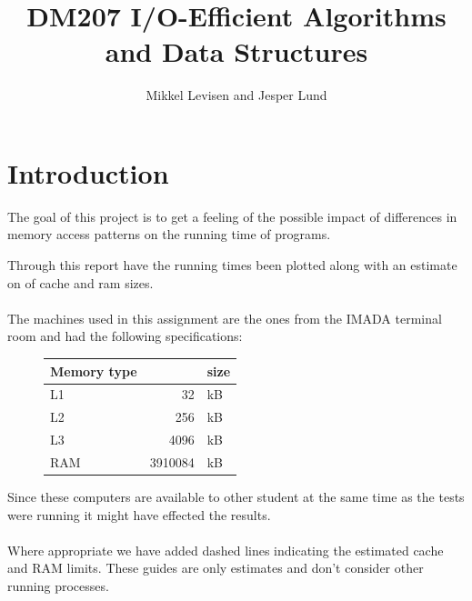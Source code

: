 \documentclass{article}
\newcommand{\subtitle}[1]{%
  \posttitle{%
    \par\end{center}
    \begin{center}\large#1\end{center}
    \vskip0.5em}%
}
\begin{document}
\title{DM207 I/O-Efficient Algorithms and Data Structures}
\subtitle{Fall 2015\\Project 1}
\author{Mikkel Levisen and Jesper Lund}
\maketitle
\thispagestyle{empty}
\newpage
\thispagestyle{empty}
\newpage
\section*{Introduction}
The goal of this project is to get a feeling of the possible impact of differences 
in memory access patterns on the running time of programs. 

Through this report have the running times been plotted along with an estimate
on of cache and ram sizes.
\\
\\
The machines used in this assignment are the ones from the IMADA terminal room 
and had the following specifications:
\begin{figure}[H]
\centering
\begin{tabular}{lrl}
  Memory type & &size\\ 
  \hline
  L1 	&  	32&kB\\
  L2 	& 	256&kB\\
  L3 	& 	4096&kB\\
  RAM 	& 	3910084& kB
\end{tabular}
\end{figure}
\noindent Since these computers are available to other student at the same time as the 
tests were running it might have effected the results.
\\
\\
Where appropriate we have added dashed lines indicating the estimated cache and 
RAM limits. These guides are only estimates and don't consider other running 
processes. 
\newpage
\end{document}
